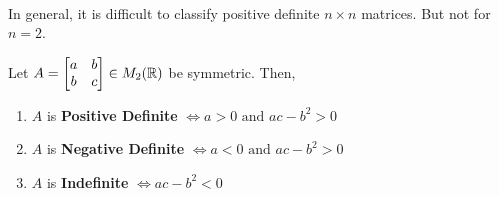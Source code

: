 \documentclass[../Analysis-3.tex]{subfiles}
\begin{document}
\

In general, it is difficult to classify positive definite $n \times n$ matrices. But not for $n = 2$.

\begin{Thm}{}{}
  Let $A = \begin{bmatrix}
      a & b \\
      b & c
    \end{bmatrix} \in M_2(\mathbb{R}) $ be symmetric. Then,
  \begin{enumerate}[label=(\roman*)]
    \item $A$ is \textbf{Positive Definite} $ \Longleftrightarrow a > 0 \text{ and } ac -b^2 >0 $ \label{charpd}
    \item $A$ is \textbf{Negative Definite} $ \Longleftrightarrow a < 0 \text{ and } ac -b^2 >0 $ \label{charnd}
    \item $A$ is \textbf{Indefinite} $ \Longleftrightarrow ac -b^2 <0 $ \label{charind}
  \end{enumerate}
\end{Thm}
\end{document}
